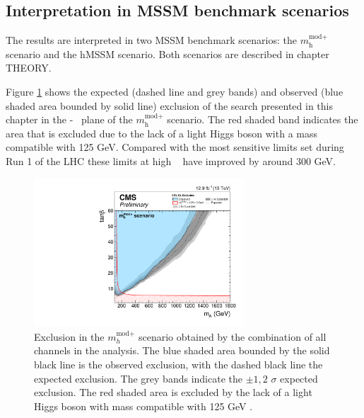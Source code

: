 \subsection{Interpretation in MSSM benchmark scenarios}
\label{sec:mssm_results_modeldep}
The results are interpreted in two MSSM benchmark scenarios: the $m_{\text{h}}^{\text{mod+}}$
scenario and the hMSSM scenario. Both scenarios are described in chapter THEORY.

Figure \ref{fig:mssm_mhmodp_2016} shows the expected (dashed line and grey bands) and
observed (blue shaded area bounded by solid line) exclusion of the search presented in this chapter
in the \mA-\tanb~ plane of the $m_{\text{h}}^{\text{mod+}}$ scenario. The red shaded band
indicates the area that is excluded due to the lack of a light Higgs boson with a mass compatible
with 125 GeV. Compared with the most sensitive limits set during Run 1 of the \ac{LHC} these
limits at high \tanb~ have improved by around 300 GeV.

\begin{figure}[h!]
\begin{center}
\includegraphics[width=0.7\textwidth]{./MSSM/Figures/CMS-PAS-HIG-16-037_Figure_012-a.pdf}
\end{center}
\caption{Exclusion in the $m_{h}^{\text{mod}+}$ scenario obtained by the combination
of all channels in the \AHtotautau analysis. The blue shaded area bounded by the 
solid black line is the observed exclusion, with the dashed black line the
expected exclusion. The grey bands indicate the $\pm 1,2$ $\sigma$ 
expected exclusion. The red shaded area
is excluded by the lack of a light Higgs boson with mass compatible with 125 GeV \cite{CMS-PAS-HIG-16-037}.}
\label{fig:mssm_mhmodp_2016}
\end{figure}


